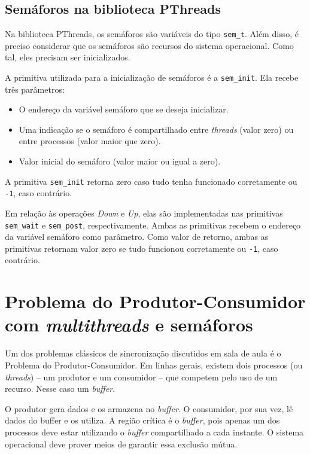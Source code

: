 \subsection{Semáforos na biblioteca PThreads}
Na biblioteca PThreads, os semáforos são variáveis do tipo \texttt{sem\_t}. Além disso, é preciso considerar que os semáforos são recursos do sistema operacional. Como tal, eles precisam ser inicializados.

A primitiva utilizada para a inicialização de semáforos é a \texttt{sem\_init}. Ela recebe três parâmetros:
\begin{itemize}
    \item O endereço da variável semáforo que se deseja inicializar.
    \item Uma indicação se o semáforo é compartilhado entre \textit{threads} (valor zero) ou entre processos (valor maior que zero). 
    \item Valor inicial do semáforo (valor maior ou igual a zero).
\end{itemize}

A primitiva \texttt{sem\_init} retorna zero caso tudo tenha funcionado corretamente ou \texttt{-1}, caso contrário.

Em relação às operações \textit{Down} e \textit{Up}, elas são implementadas nas primitivas \texttt{sem\_wait} e \texttt{sem\_post}, respectivamente. Ambas as primitivas recebem o endereço da variável semáforo como parâmetro. Como valor de retorno, ambas as primitivas retornam valor zero se tudo funcionou corretamente ou \texttt{-1}, caso contrário.



\section{Problema do Produtor-Consumidor com \textit{multithreads} e semáforos}

Um dos problemas clássicos de sincronização discutidos em sala de aula é o Problema do Produtor-Consumidor. Em linhas gerais, existem dois processos (ou \textit{threads}) -- um produtor e um consumidor -- que competem pelo uso de um recurso. Nesse caso um \textit{buffer}.

O produtor gera dados e os armazena no \textit{buffer}. O consumidor, por sua vez, lê dados do buffer e os utiliza. A região crítica é o \textit{buffer}, pois apenas um dos processos deve estar utilizando o \textit{buffer} compartilhado a cada instante. O sistema operacional deve prover meios de garantir essa exclusão mútua.

